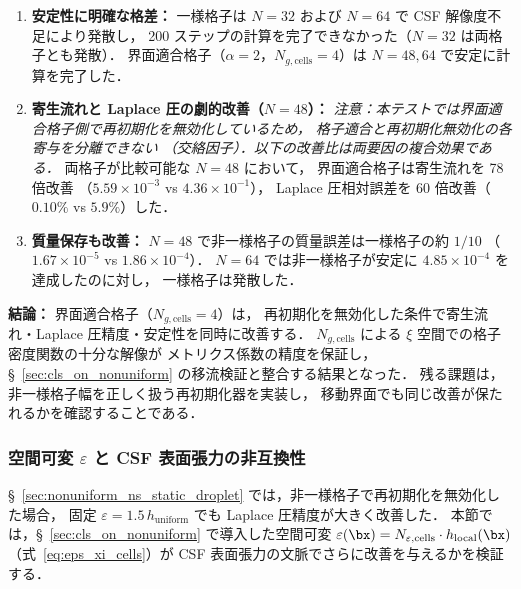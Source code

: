 \begin{enumerate}[noitemsep]
  \item \textbf{安定性に明確な格差：}
        一様格子は $N = 32$ および $N = 64$ で CSF 解像度不足により発散し，
        200 ステップの計算を完了できなかった（$N = 32$ は両格子とも発散）．
        界面適合格子（$\alpha = 2$，$N_{g,\text{cells}} = 4$）は
        $N = 48, 64$ で安定に計算を完了した．
  \item \textbf{寄生流れと Laplace 圧の劇的改善（$N = 48$）：}
        \emph{注意：本テストでは界面適合格子側で再初期化を無効化しているため，
        格子適合と再初期化無効化の各寄与を分離できない
        （交絡因子）．以下の改善比は両要因の複合効果である．}
        両格子が比較可能な $N = 48$ において，
        界面適合格子は寄生流れを 78 倍改善
        （$5.59 \times 10^{-3}$ vs $4.36 \times 10^{-1}$），
        Laplace 圧相対誤差を 60 倍改善（$0.10\%$ vs $5.9\%$）した．
  \item \textbf{質量保存も改善：}
        $N = 48$ で非一様格子の質量誤差は一様格子の約 $1/10$
        （$1.67 \times 10^{-5}$ vs $1.86 \times 10^{-4}$）．
        $N = 64$ では非一様格子が安定に $4.85 \times 10^{-4}$ を達成したのに対し，
        一様格子は発散した．
\end{enumerate}

\noindent\textbf{結論：}
界面適合格子（$N_{g,\text{cells}} = 4$）は，
再初期化を無効化した条件で寄生流れ・Laplace 圧精度・安定性を同時に改善する．
$N_{g,\text{cells}}$ による $\xi$ 空間での格子密度関数の十分な解像が
メトリクス係数の精度を保証し，§~\ref{sec:cls_on_nonuniform} の移流検証と整合する結果となった．
残る課題は，非一様格子幅を正しく扱う再初期化器を実装し，
移動界面でも同じ改善が保たれるかを確認することである．


\subsubsection{\texorpdfstring{空間可変 $\varepsilon$ と CSF 表面張力の非互換性}{空間可変 epsilon と CSF 表面張力の非互換性}}
\label{sec:local_eps_validation}

§~\ref{sec:nonuniform_ns_static_droplet} では，非一様格子で再初期化を無効化した場合，
固定 $\varepsilon = 1.5\,h_{\mathrm{uniform}}$ でも Laplace 圧精度が大きく改善した．
本節では，§~\ref{sec:cls_on_nonuniform} で導入した空間可変
$\varepsilon(\bx) = N_{\varepsilon,\text{cells}} \cdot h_{\mathrm{local}}(\bx)$
（式~\eqref{eq:eps_xi_cells}）が CSF 表面張力の文脈でさらに改善を与えるかを検証する．

